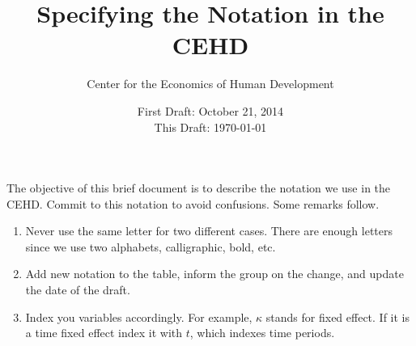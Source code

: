 

\title{Specifying the Notation in the CEHD}
\author{Center for the Economics of Human Development}
\date{First Draft: October 21, 2014 \\ This Draft: \today}

\maketitle

\noindent The objective of this brief document is to describe the notation we use in the CEHD. Commit to this notation to avoid confusions. Some remarks follow.

\begin{enumerate}
\item Never use the same letter for two different cases. There are enough letters since we use two alphabets, calligraphic, bold, etc.
\item Add new notation to the table, inform the group on the change, and update the date of the draft. 
\item Index you variables accordingly. For example, $\kappa$ stands for fixed effect. If it is a time fixed effect index it with $t$, which indexes time periods. 
\end{enumerate}

